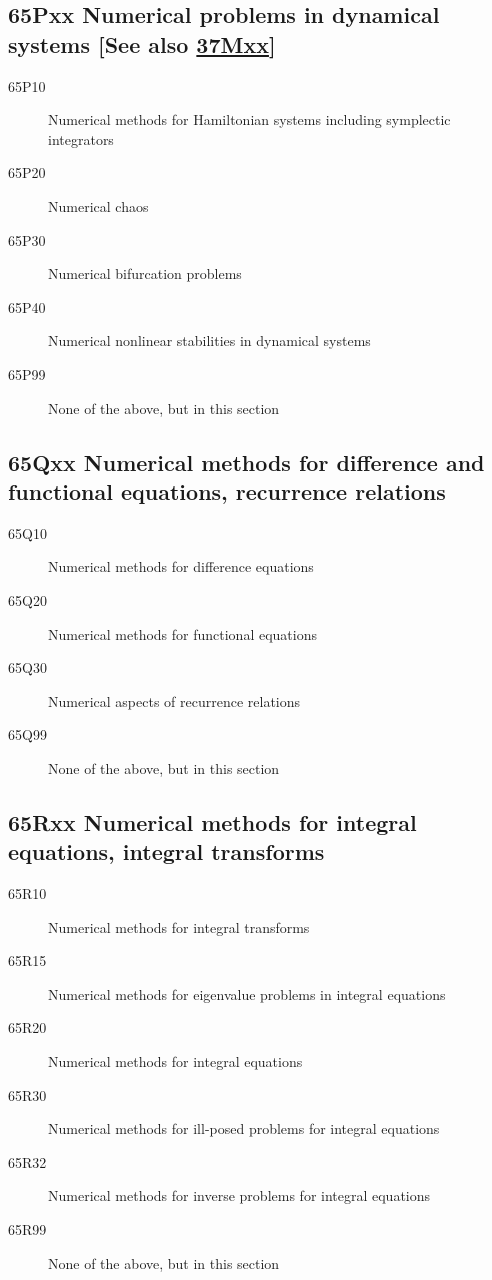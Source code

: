 \documentclass[letterpaper]{article}
\begin{document}
\subsection*{65Pxx  Numerical problems in dynamical systems [See also \hyperref[37Mxx]{37Mxx}] }\label{65Pxx}
\begin{description}  
\item [65P10]\label{65P10} Numerical methods for Hamiltonian systems including symplectic integrators
\item [65P20]\label{65P20} Numerical chaos
\item [65P30]\label{65P30} Numerical bifurcation problems
\item [65P40]\label{65P40} Numerical nonlinear stabilities in dynamical systems
\item [65P99]\label{65P99} None of the above, but in this section
\end{description}
\subsection*{65Qxx  Numerical methods for difference and functional equations, recurrence relations }\label{65Qxx}
\begin{description}  
\item [65Q10]\label{65Q10} Numerical methods for difference equations
\item [65Q20]\label{65Q20} Numerical methods for functional equations
\item [65Q30]\label{65Q30} Numerical aspects of recurrence relations
\item [65Q99]\label{65Q99} None of the above, but in this section
\end{description}
\subsection*{65Rxx  Numerical methods for integral equations, integral transforms }\label{65Rxx}
\begin{description}  
\item [65R10]\label{65R10} Numerical methods for integral transforms
\item [65R15]\label{65R15} Numerical methods for eigenvalue problems in integral equations
\item [65R20]\label{65R20} Numerical methods for integral equations
\item [65R30]\label{65R30} Numerical methods for ill-posed problems for integral equations
\item [65R32]\label{65R32} Numerical methods for inverse problems for integral equations
\item [65R99]\label{65R99} None of the above, but in this section
\end{description}
\end{document}
